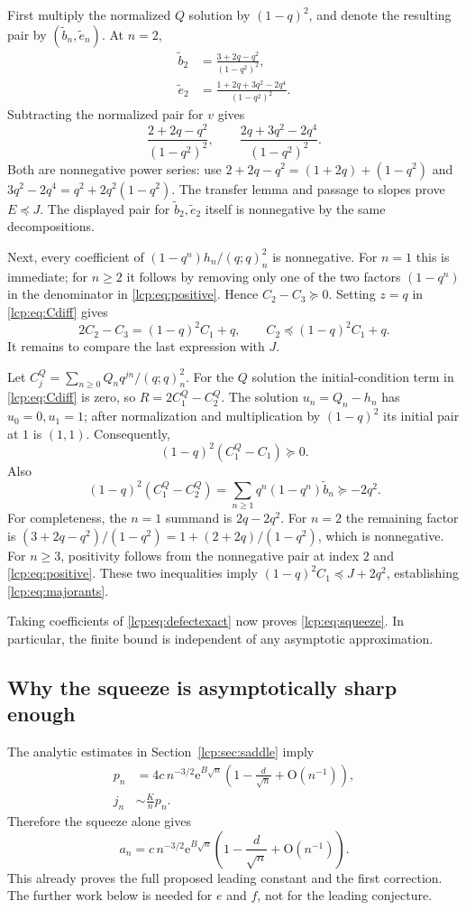 \documentclass[11pt]{article}
\numberwithin{equation}{section}
\theoremstyle{definition}\newtheorem{definition}[theorem]{Definition}
\theoremstyle{remark}\newtheorem{remark}[theorem]{Remark}
\newcommand{\OO}{\mathrm O}
\newcommand{\pp}[1]{(q;q)_{#1}}
\newcommand{\pre}{\preccurlyeq}
\newcommand{\ee}{\mathrm e}
\begin{document}
First multiply the normalized $Q$ solution by $(1-q)^2$, and denote the
resulting pair by $(\widetilde b_n,\widetilde e_n)$.
At $n=2$,
\begin{align*}
 \widetilde b_2&=\frac{3+2q-q^2}{(1-q^2)^2},\\
 \widetilde e_2&=\frac{1+2q+3q^2-2q^4}{(1-q^2)^2}.
\end{align*}
Subtracting the normalized pair for $v$ gives
\[
 \frac{2+2q-q^2}{(1-q^2)^2},\qquad
 \frac{2q+3q^2-2q^4}{(1-q^2)^2}.
\]
Both are nonnegative power series: use
$2+2q-q^2=(1+2q)+(1-q^2)$ and
$3q^2-2q^4=q^2+2q^2(1-q^2)$.
The transfer lemma and passage to slopes prove $E\pre J$.
The displayed pair for $\widetilde b_2,\widetilde e_2$ itself is
nonnegative by the same decompositions.

Next, every coefficient of $(1-q^n)h_n/\pp n^2$ is nonnegative.
For $n=1$ this is immediate; for $n\ge2$ it follows by removing only
one of the two factors $(1-q^n)$ in the denominator in
\eqref{lcp:eq:positive}. Hence $C_2-C_3\succeq0$.
Setting $z=q$ in \eqref{lcp:eq:Cdiff} gives
\[
 2C_2-C_3=(1-q)^2C_1+q,
 \qquad C_2\pre(1-q)^2C_1+q.
\]
It remains to compare the last expression with $J$.

Let $C^Q_j=\sum_{n\ge0}Q_nq^{jn}/\pp n^2$.
For the $Q$ solution the initial-condition term in \eqref{lcp:eq:Cdiff}
is zero, so $R=2C^Q_1-C^Q_2$.
The solution $u_n=Q_n-h_n$ has $u_0=0,u_1=1$; after normalization
and multiplication by $(1-q)^2$ its initial pair at $1$ is $(1,1)$.
Consequently,
\[
 (1-q)^2(C^Q_1-C_1)\succeq0.
\]
Also
\[
 (1-q)^2(C^Q_1-C^Q_2)
 =\sum_{n\ge1}q^n(1-q^n)\widetilde b_n\succeq-2q^2.
\]
For completeness, the $n=1$ summand is $2q-2q^2$.
For $n=2$ the remaining factor is
$(3+2q-q^2)/(1-q^2)=1+(2+2q)/(1-q^2)$, which is nonnegative.
For $n\ge3$, positivity follows from the nonnegative pair at index $2$
and \eqref{lcp:eq:positive}.
These two inequalities imply
$(1-q)^2C_1\pre J+2q^2$, establishing \eqref{lcp:eq:majorants}.

Taking coefficients of \eqref{lcp:eq:defectexact} now proves
\eqref{lcp:eq:squeeze}. In particular, the finite bound is independent of
any asymptotic approximation.

\subsection{Why the squeeze is asymptotically sharp enough}
The analytic estimates in Section~\ref{lcp:sec:saddle} imply
\begin{align}\label{lcp:eq:pfirst}
 p_n&=4c\,n^{-3/2}\ee^{B\sqrt n}
       \left(1-\frac d{\sqrt n}+\OO(n^{-1})\right),\\
 j_n&\sim\frac Kn p_n.\label{lcp:eq:j}
\end{align}
Therefore the squeeze alone gives
\[
 a_n=c\,n^{-3/2}\ee^{B\sqrt n}
       \left(1-\frac d{\sqrt n}+\OO(n^{-1})\right).
\]
This already proves the full proposed leading constant and the first
correction. The further work below is needed for $e$ and $f$, not for
the leading conjecture.
\end{document}
